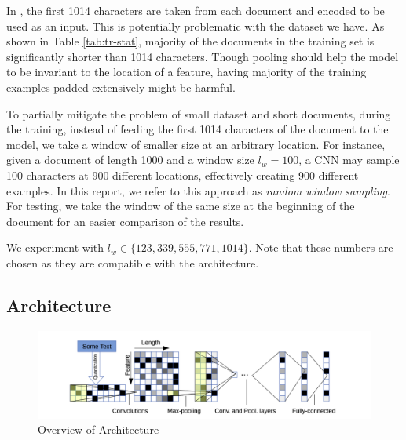 In \citep{zhang2015character}, the first 1014 characters are taken from each document and encoded to be used as an input.
This is potentially problematic with the dataset we have.
As shown in Table \ref{tab:tr-stat}, majority of the documents in the training set is significantly shorter than 1014 characters.
Though pooling should help the model to be invariant to the location of a feature, having majority of the training examples padded extensively might be harmful.

To partially mitigate the problem of small dataset and short documents, during the training, instead of feeding the first 1014 characters of the document to the model, we take a window of smaller size at an arbitrary location.
For instance, given a document of length 1000 and a window size $l_w = 100$, a CNN may sample 100 characters at 900 different locations, effectively creating 900 different examples.
In this report, we refer to this approach as \emph{random window sampling}.
For testing, we take the window of the same size at the beginning of the document for an easier comparison of the results.

We experiment with $l_w \in \{123, 339, 555, 771, 1014\}$.
Note that these numbers are chosen as they are compatible with the architecture.
\subsection{Architecture}
\begin{figure}[h]
\includegraphics[width=\textwidth]{architecture.png}
\caption{Overview of Architecture}
\label{fig:architecture}
\end{figure}

